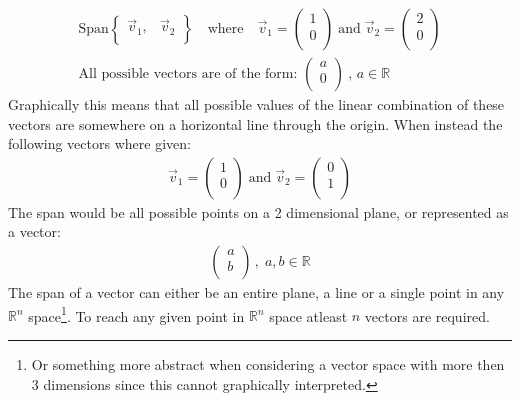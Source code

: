 \documentclass[11pt, a4paper]{article}
\begin{document}
\begin{align*}
    \text{Span} 
    \begin{Bmatrix}
        \vec{v}_1, & \vec{v}_2 \\
    \end{Bmatrix}
    \hspace{1em} \text{where} \hspace{1em} \vec{v}_1 =
    \begin{pmatrix}
        1\\
        0\\
    \end{pmatrix}
    \; \text{and} \; \vec{v}_2 = 
    \begin{pmatrix}
        2\\
        0\\
    \end{pmatrix}\\
    \text{All possible vectors are of the form: }
    \begin{pmatrix}
        a\\
        0\\
    \end{pmatrix}
    \: ,\, a \in \mathbb{R}
\end{align*}
Graphically this means that all possible values of the linear combination 
of these vectors are somewhere on a horizontal line through the origin.
When instead the following vectors where given:
\begin{align*}
    \vec{v}_1 =
    \begin{pmatrix}
        1\\
        0\\
    \end{pmatrix}
    \; \text{and} \; \vec{v}_2 =
    \begin{pmatrix}
        0\\
        1\\
    \end{pmatrix}
\end{align*}
The span would be all possible points on a 2 dimensional plane, or represented as a vector:
\begin{align*}
    \begin{pmatrix}
        a\\
        b\\
    \end{pmatrix}
    \, , \; a, b \in \mathbb{R}
\end{align*}
The span of a vector can either be an entire plane, a line or a single point in any $\mathbb{R}^n$ space\footnote{
    Or something more abstract when considering a vector space with more then 3 dimensions since this cannot graphically interpreted.}.
To reach any given point in $\mathbb{R}^n$ space atleast $n$ vectors are required.
\end{document}
